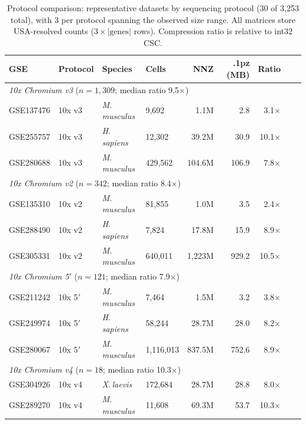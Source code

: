 \documentclass[10pt,twocolumn,letterpaper]{article}
\begin{document}
\begin{table}[h]
\centering
\caption{Protocol comparison: representative datasets by sequencing protocol (30 of 3{,}253 total), with 3 per protocol spanning the observed size range. All matrices store USA-resolved counts ($3 \times |\text{genes}|$ rows). Compression ratio is relative to int32 CSC.}
\label{tab:protocols}
\scriptsize
\begin{tabular}{llllrrrrr}
\toprule
GSE & Protocol & Species & Cells & NNZ & .1pz (MB) & Ratio \\
\midrule
\multicolumn{7}{l}{\textit{10x Chromium v3} ($n = 1{,}309$; median ratio 9.5$\times$)} \\
GSE137476  & 10x v3 & \textit{M.\,musculus}    &    9{,}692 &    1.1M &    2.8 &  3.1$\times$ \\
GSE255757  & 10x v3 & \textit{H.\,sapiens}     &   12{,}302 &   39.2M &   30.9 & 10.1$\times$ \\
GSE280688  & 10x v3 & \textit{M.\,musculus}    &  429{,}562 &  104.6M &  106.9 &  7.8$\times$ \\
\midrule
\multicolumn{7}{l}{\textit{10x Chromium v2} ($n = 342$; median ratio 8.4$\times$)} \\
GSE135310  & 10x v2 & \textit{M.\,musculus}    &   81{,}855 &    1.0M &    3.5 &  2.4$\times$ \\
GSE288490  & 10x v2 & \textit{H.\,sapiens}     &    7{,}824 &   17.8M &   15.9 &  8.9$\times$ \\
GSE305331  & 10x v2 & \textit{M.\,musculus}    &  640{,}011 &  1{,}223M &  929.2 & 10.5$\times$ \\
\midrule
\multicolumn{7}{l}{\textit{10x Chromium 5$'$} ($n = 121$; median ratio 7.9$\times$)} \\
GSE211242  & 10x 5$'$ & \textit{M.\,musculus}    &    7{,}464 &    1.5M &    3.2 &  3.8$\times$ \\
GSE249974  & 10x 5$'$ & \textit{H.\,sapiens}     &   58{,}244 &   28.7M &   28.0 &  8.2$\times$ \\
GSE280067  & 10x 5$'$ & \textit{M.\,musculus}    & 1{,}116{,}013 &  837.5M &  752.6 &  8.9$\times$ \\
\midrule
\multicolumn{7}{l}{\textit{10x Chromium v4} ($n = 18$; median ratio 10.3$\times$)} \\
GSE304926  & 10x v4 & \textit{X.\,laevis}      &  172{,}684 &   28.7M &   28.8 &  8.0$\times$ \\
GSE289270  & 10x v4 & \textit{M.\,musculus}    &   11{,}608 &   69.3M &   53.7 & 10.3$\times$ \\

\end{tabular}
\end{table}
\end{document}
